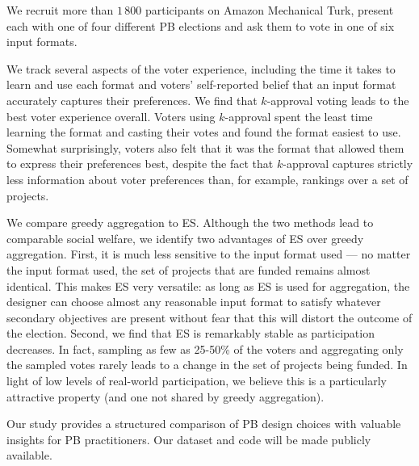 \documentclass[runningheads]{llncs}
\newcommand{\mes}{ES}
\begin{document}
We recruit more than $1\,800$ participants on Amazon Mechanical Turk,  present each with one of four different PB elections  and ask them to vote in one of six   input formats. 

We track several aspects of the voter experience, including the time it takes to learn and use each format and voters' self-reported belief that an input format accurately captures their preferences.  
%
We find that $k$-approval voting leads to the best voter experience overall. Voters using $k$-approval spent the least time  learning the format and casting their votes and found the format easiest to use. Somewhat surprisingly, voters also felt that  it was the format that allowed them to express their preferences best, despite the fact that $k$-approval captures strictly less information about voter preferences than, for example,  rankings over a set of projects. 

We compare greedy aggregation to \mes{}. Although the two methods lead to comparable social welfare, we identify two  advantages of \mes{} over greedy aggregation. First, it is much less sensitive to the input format used --- no matter the input format used, the set of projects that are funded remains almost identical. This makes \mes{} very versatile: as long as \mes{} is used for aggregation, the designer can choose almost any reasonable input format to satisfy whatever secondary objectives are present without fear that this will distort the outcome of the election. Second, we find that \mes{} is remarkably stable as participation decreases. In fact, sampling as few as 25-50\% of the voters and aggregating only the sampled votes rarely leads to a change in the set of projects being funded. In light of low levels of real-world participation, we believe this is a particularly attractive property (and one  not shared by greedy aggregation). 

Our study provides  a structured comparison of PB design choices with valuable insights for PB practitioners.  Our dataset and code will be made publicly available. %
\end{document}
